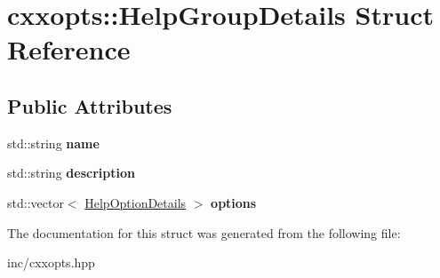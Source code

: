 \hypertarget{structcxxopts_1_1HelpGroupDetails}{}\section{cxxopts\+:\+:Help\+Group\+Details Struct Reference}
\label{structcxxopts_1_1HelpGroupDetails}
\subsection*{Public Attributes}
\begin{DoxyCompactItemize}
\item 
std\+::string {\bfseries name}\hypertarget{structcxxopts_1_1HelpGroupDetails_abc389252a862724a1404d3c22fda6fc2}{}\label{structcxxopts_1_1HelpGroupDetails_abc389252a862724a1404d3c22fda6fc2}

\item 
std\+::string {\bfseries description}\hypertarget{structcxxopts_1_1HelpGroupDetails_a42db1cc0f95adbda0b1d73ca54ffb468}{}\label{structcxxopts_1_1HelpGroupDetails_a42db1cc0f95adbda0b1d73ca54ffb468}

\item 
std\+::vector$<$ \hyperlink{structcxxopts_1_1HelpOptionDetails}{Help\+Option\+Details} $>$ {\bfseries options}\hypertarget{structcxxopts_1_1HelpGroupDetails_ab2869d214c7fc9ac859d030afca33243}{}\label{structcxxopts_1_1HelpGroupDetails_ab2869d214c7fc9ac859d030afca33243}

\end{DoxyCompactItemize}


The documentation for this struct was generated from the following file\+:\begin{DoxyCompactItemize}
\item 
inc/cxxopts.\+hpp\end{DoxyCompactItemize}
